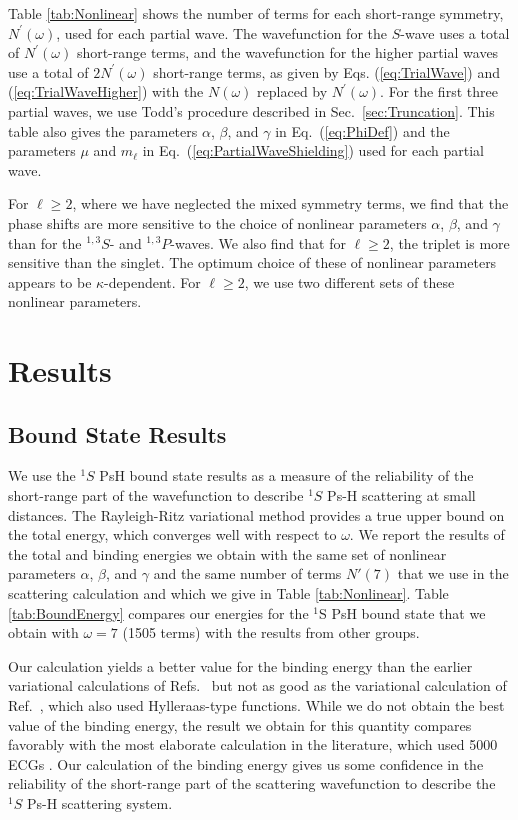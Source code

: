 \documentclass[preprint,showpacs,showkeys,preprintnumbers,amsmath,amssymb,longbibliography,pra,aps]{revtex4-1}
\begin{document}
{Table \ref{tab:Nonlinear} shows
the number of terms for each short-range 
symmetry, $N^\prime(\omega)$, used for each partial wave. The wavefunction
for the $S$-wave uses a 
total of $N^\prime(\omega)$ short-range terms, and the wavefunction for the
higher partial waves 
use a total of $2 N^\prime(\omega)$ short-range terms, as given by Eqs.
(\ref{eq:TrialWave}) and (\ref{eq:TrialWaveHigher}) with the 
$N(\omega)$ replaced by $N^\prime(\omega)$.
For the first three partial waves,
we use Todd's procedure described in Sec.~\ref{sec:Truncation}.
This table also gives the parameters $\alpha$, $\beta$, and
$\gamma$ in Eq.~(\ref{eq:PhiDef}) and the parameters $\mu$ and $m_\ell$ in 
Eq.~(\ref{eq:PartialWaveShielding}) used for each partial wave.

For $\ell \geq 2$, where we have neglected the mixed symmetry terms,
we find that the phase shifts are more sensitive to the
choice of nonlinear parameters $\alpha$, $\beta$, and $\gamma$
than for the $^{1,3}S$- and $^{1,3}P$-waves. We also find that for $\ell \geq 2$,
the triplet is more sensitive than the singlet. The optimum choice of these
of nonlinear parameters appears to be $\kappa$-dependent. For $\ell \geq 2$, we
use two different sets of these nonlinear parameters.


\section{Results}
\label{sec:Results}

\subsection{Bound State Results}

We use the $^1S$ PsH bound state results as a measure of the reliability of the 
short-range part of the wavefunction to describe $^1S$ Ps-H scattering at
small distances. The Rayleigh-Ritz variational method provides a true upper
bound on the total energy, which converges well with respect to $\omega$.
We report the results of the total and binding energies we obtain with the
same set of nonlinear parameters $\alpha$, $\beta$, and $\gamma$ and the
same number of terms $N'(7)$ that we use in the scattering calculation and
which we give in Table \ref{tab:Nonlinear}. Table \ref{tab:BoundEnergy}
compares our energies for the $^1$S PsH bound state that we obtain with
$\omega = 7$ (1505 terms) with the results from other groups.

Our calculation yields a better value for the binding energy than the earlier 
variational calculations of Refs.~\cite{VanReeth2003,VanReeth2004} but not
as good as the variational calculation of Ref.~\cite{Yan1999}, which also
used Hylleraas-type functions. While we do not obtain the best value of the 
binding energy, the result
we obtain for this quantity compares favorably with the most elaborate 
calculation in the literature, which used 5000 ECGs \cite{Bubin2006}. Our 
calculation of the binding energy gives us some confidence in the reliability 
of the short-range part of the scattering wavefunction to describe the $^1S$ 
Ps-H scattering system.

}
\end{document}
